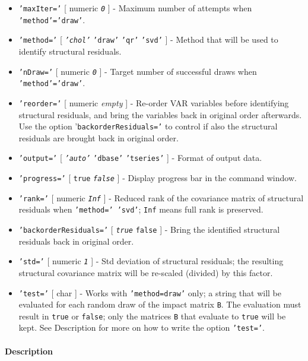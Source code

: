 \begin{itemize}
\item
  \texttt{'maxIter='} {[} numeric \textbar{} \emph{\texttt{0}} {]} -
  Maximum number of attempts when \texttt{'method'='draw'}.
\item
  \texttt{'method='} {[} \emph{\texttt{'chol'}} \textbar{}
  \texttt{'draw'} \textbar{} \texttt{'qr'} \textbar{} \texttt{'svd'} {]}
  - Method that will be used to identify structural residuals.
\item
  \texttt{'nDraw='} {[} numeric \textbar{} \emph{\texttt{0}} {]} -
  Target number of successful draws when \texttt{'method'='draw'}.
\item
  \texttt{'reorder='} {[} numeric \textbar{} \emph{empty} {]} - Re-order
  VAR variables before identifying structural residuals, and bring the
  variables back in original order afterwards. Use the option
  '\texttt{backorderResiduals='} to control if also the structural
  residuals are brought back in original order.
\item
  \texttt{'output='} {[} \emph{\texttt{'auto'}} \textbar{}
  \texttt{'dbase'} \textbar{} \texttt{'tseries'} {]} - Format of output
  data.
\item
  \texttt{'progress='} {[} \texttt{true} \textbar{}
  \emph{\texttt{false}} {]} - Display progress bar in the command
  window.
\item
  \texttt{'rank='} {[} numeric \textbar{} \emph{\texttt{Inf}} {]} -
  Reduced rank of the covariance matrix of structural residuals when
  \texttt{'method=' 'svd'}; \texttt{Inf} means full rank is preserved.
\item
  \texttt{'backorderResiduals='} {[} \emph{\texttt{true}} \textbar{}
  \texttt{false} {]} - Bring the identified structural residuals back in
  original order.
\item
  \texttt{'std='} {[} numeric \textbar{} \emph{\texttt{1}} {]} - Std
  deviation of structural residuals; the resulting structural covariance
  matrix will be re-scaled (divided) by this factor.
\item
  \texttt{'test='} {[} char {]} - Works with \texttt{'method=draw'}
  only; a string that will be evaluated for each random draw of the
  impact matrix \texttt{B}. The evaluation must result in \texttt{true}
  or \texttt{false}; only the matrices \texttt{B} that evaluate to
  \texttt{true} will be kept. See Description for more on how to write
  the option \texttt{'test='}.
\end{itemize}

\paragraph{Description}\label{description}

